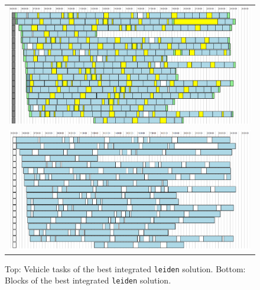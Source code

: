 \documentclass[]{article}
\begin{document}
\begin{figure}[!p]
  \centering
  \begin{tabular}{@{}c@{}}
    \includegraphics[width=\textwidth]{images/leiden-vehicle.png} \\[1ex]
    \includegraphics[width=\textwidth]{images/leiden-blocks.png}
  \end{tabular}
  \caption{Top: Vehicle tasks of the best integrated \texttt{leiden} solution. Bottom: Blocks of the best integrated \texttt{leiden} solution.}
  \label{fig:leiden-int-solution-vh-bl}
\end{figure}

\clearpage
\end{document}
